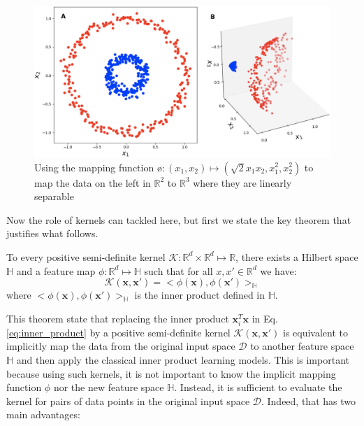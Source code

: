 \begin{figure}[H]
\centering
\includegraphics[scale=0.25]{figs/poly_kenrnel.png}
\caption[Lifting data to a higher-dimension space to get linearly separable classes]{ Using the mapping function \o$:(x_1,x_2)\mapsto (\sqrt{2}x_1x_2,x_1^2,x_2^2)$ to map the data on the left in $\mathbb{R}^2$ to $\mathbb{R}^3$ where they are linearly separable}
\label{fig:polynomial_kernel}
\end{figure}
Now the role of kernels can tackled here, but first we state the key theorem that justifies what follows.
\begin{theorem}
To every positive semi-definite kernel $\mathcal{K}:\mathbb{R}^d\times \mathbb{R}^d\mapsto \mathbb{R}$, there exists a Hilbert space $\mathbb{H}$ and a feature map $\phi:\mathbb{R}^d\mapsto\mathbb{H}$ such that for all $x,x'\in\mathbb{R}^d$ we have: 
\begin{equation}
\label{eq:kernel_main_equation}
    \mathcal{K}(\mathbf{x},\mathbf{x}')=<\phi(\mathbf{x}),\phi(\mathbf{x}')>_\mathbb{H}
\end{equation}
where $<\phi(\mathbf{x}),\phi(\mathbf{x}')>_\mathbb{H}$ is the inner product defined in $\mathbb{H}$.
\end{theorem}
This theorem state that replacing the inner product \textbf{$\mathbf{x}_i^T\mathbf{x}$} in Eq. \ref{eq:inner_product} by a positive semi-definite kernel $\mathcal{K}(\mathbf{x},\mathbf{x}')$ is equivalent to implicitly map the data from the original input space $\mathcal{D}$ to another feature space $\mathbb{H}$ and then apply the classical inner product learning models. This is important because using such kernels, it is not important to know the implicit mapping function $\phi$ nor the new feature space $\mathbb{H}$. Instead, it is sufficient to evaluate the kernel for pairs of data points in the original input space $\mathcal{D}$. Indeed, that has two main advantages:
